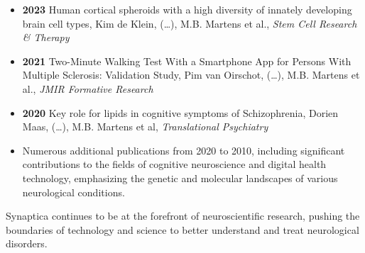 \begin{itemize}
    \item \textbf{2023} Human cortical spheroids with a high diversity of innately developing brain cell types, Kim de Klein, (\dots), M.B. Martens et al., \textit{Stem Cell Research \& Therapy}
    \item \textbf{2021} Two-Minute Walking Test With a Smartphone App for Persons With Multiple Sclerosis: Validation Study, Pim van Oirschot, (\dots), M.B. Martens et al., \textit{JMIR Formative Research}
    \item \textbf{2020} Key role for lipids in cognitive symptoms of Schizophrenia, Dorien Maas, (\dots), M.B. Martens et al, \textit{Translational Psychiatry}
    \item Numerous additional publications from 2020 to 2010, including significant contributions to the fields of cognitive neuroscience and digital health technology, emphasizing the genetic and molecular landscapes of various neurological conditions.
\end{itemize}

\noindent Synaptica continues to be at the forefront of neuroscientific research, pushing the boundaries of technology and science to better understand and treat neurological disorders.
